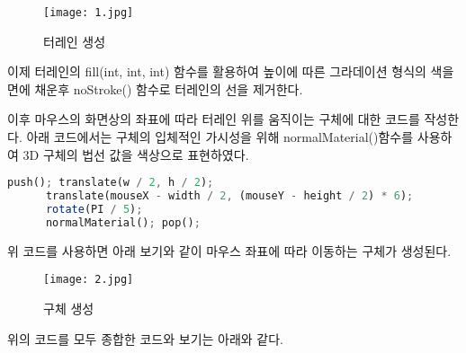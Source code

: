 \documentclass{article}
\begin{document}
    \begin{figure}[htbp]
        \centering
        \texttt{[image: 1.jpg]}
        \caption{터레인 생성}
        \label{fig:terrain1}
    \end{figure}

    \vspace{120pt}

    이제 터레인의 fill(int, int, int) 함수를 활용하여 높이에 따른 그라데이션 형식의 색을 면에 채운후 noStroke() 함수로 터레인의 선을 제거한다.

    이후 마우스의 화면상의 좌표에 따라 터레인 위를 움직이는 구체에 대한 코드를 작성한다.
    아래 코드에서는 구체의 입체적인 가시성을 위해 normalMaterial()함수를 사용하여 3D 구체의 법선 값을 색상으로 표현하였다.
    \begin{lstlisting}[language=Octave]
      push(); translate(w / 2, h / 2);
      translate(mouseX - width / 2, (mouseY - height / 2) * 6);
      rotate(PI / 5);
      normalMaterial(); pop();
    \end{lstlisting}

    위 코드를 사용하면 아래 보기와 같이 마우스 좌표에 따라 이동하는 구체가 생성된다.
    \begin{figure}[htbp]
        \centering
        \texttt{[image: 2.jpg]}
        \caption{구체 생성}
        \label{fig:sphere1}
    \end{figure}
    
    \vspace{40pt}
    위의 코드를 모두 종합한 코드와 보기는 아래와 같다.
    
\end{document}
